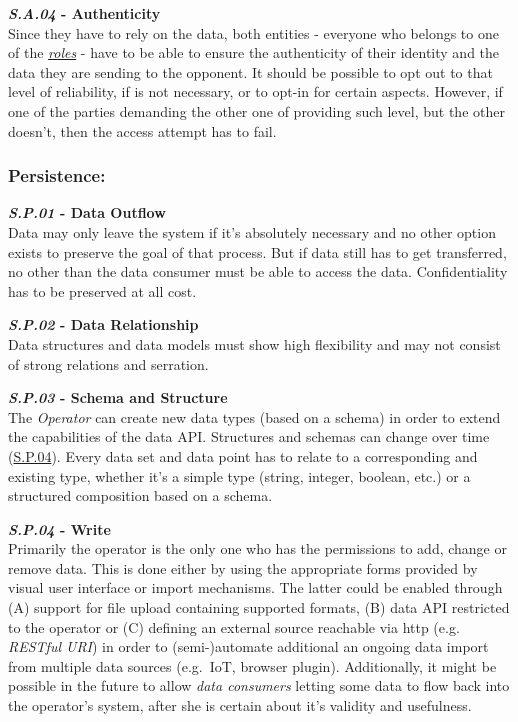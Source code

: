 \documentclass[12pt,english,a4paper,titlepage,cleardoublepage=empty,dottedtoc]{report}
\begin{document}
\textbf{\emph{\protect\hypertarget{sa04}{}{S.A.04}} - Authenticity}\\
Since they have to rely on the data, both entities - everyone who
belongs to one of the \emph{\protect\hyperlink{sa03}{roles}} - have to
be able to ensure the authenticity of their identity and the data they
are sending to the opponent. It should be possible to opt out to that
level of reliability, if is not necessary, or to opt-in for certain
aspects. However, if one of the parties demanding the other one of
providing such level, but the other doesn't, then the access attempt has
to fail.

\subsubsection{Persistence:}\label{persistence}

\textbf{\emph{\protect\hypertarget{sp01}{}{S.P.01}} - Data Outflow}\\
Data may only leave the system if it's absolutely necessary and no other
option exists to preserve the goal of that process. But if data still
has to get transferred, no other than the data consumer must be able to
access the data. Confidentiality has to be preserved at all cost.

\textbf{\emph{\protect\hypertarget{sp02}{}{S.P.02}} - Data
Relationship}\\
Data structures and data models must show high flexibility and may not
consist of strong relations and serration.

\textbf{\emph{\protect\hypertarget{sp03}{}{S.P.03}} - Schema and
Structure}\\
The \emph{Operator} can create new data types (based on a schema) in
order to extend the capabilities of the data API. Structures and schemas
can change over time (\protect\hyperlink{sp04}{S.P.04}). Every data set
and data point has to relate to a corresponding and existing type,
whether it's a simple type (string, integer, boolean, etc.) or a
structured composition based on a schema.

\textbf{\emph{\protect\hypertarget{sp04}{}{S.P.04}} - Write}\\
Primarily the operator is the only one who has the permissions to add,
change or remove data. This is done either by using the appropriate
forms provided by visual user interface or import mechanisms. The latter
could be enabled through (A) support for file upload containing
supported formats, (B) data API restricted to the operator or (C)
defining an external source reachable via http (e.g. \emph{RESTful URI})
in order to (semi-)automate additional an ongoing data import from
multiple data sources (e.g.~IoT, browser plugin). Additionally, it might
be possible in the future to allow \emph{data consumers} letting some
data to flow back into the operator's system, after she is certain about
it's validity and usefulness.
\end{document}

